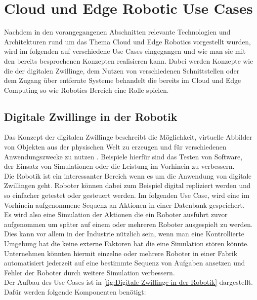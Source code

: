 \section{Cloud und Edge Robotic Use Cases} %
\label{sec:Cloud und Edge Robotic Use cases}

Nachdem in den vorangegangenen Abschnitten relevante Technologien und Architekturen rund um das Thema Cloud und Edge Robotics vorgestellt wurden, wird im folgenden auf verschiedene Use Cases eingegangen und wie man sie mit den bereits besprochenen Konzepten realisieren kann. Dabei werden Konzepte wie die der digitalen Zwillinge, dem Nutzen von verschiedenen Schnittstellen oder dem Zugang über entfernte Systeme behandelt die bereits im Cloud und Edge Computing so wie Robotics Bereich eine Rolle spielen.\\

\subsection{Digitale Zwillinge in der Robotik} %
\label{sub:Digitale Zwillinge in der Robotik}

Das Konzept der digitalen Zwillinge beschreibt die Möglichkeit, virtuelle Abbilder von Objekten aus der physischen Welt zu erzeugen und für verschiedenen Anwendungszwecke zu nutzen \cite{fullerDigitalTwinEnabling2020}. Beispiele hierfür sind das Testen von Software, der Einsatz von Simulationen oder die Leistung im Vorhinein zu verbessern.\\
Die Robotik ist ein interessanter Bereich wenn es um die Anwendung von digitale Zwillingen geht. Roboter können dabei zum Beispiel digital repliziert werden und so einfacher getestet oder gesteuert werden. Im folgenden Use Case, wird eine im Vorhinein aufgenommene Sequenz an Aktionen in einer Datenbank gespeichert. Es wird also eine Simulation der Aktionen die ein Roboter ausführt zuvor aufgenommen um später auf einem oder mehreren Roboter ausgespielt zu werden. Dies kann vor allem in der Industrie nützlich sein, wenn man eine Kontrollierte Umgebung hat die keine externe Faktoren hat die eine Simulation stören könnte. Unternehmen könnten hiermit einzelne oder mehrere Roboter in einer Fabrik automatisiert jederzeit auf eine bestimmte Sequenz von Aufgaben ansetzen und Fehler der Roboter durch weitere Simulation verbessern.\\

Der Aufbau des Use Cases ist in \ref{fig:Digitale Zwillinge in der Robotik} dargestellt. Dafür werden folgende Komponenten benötigt:

